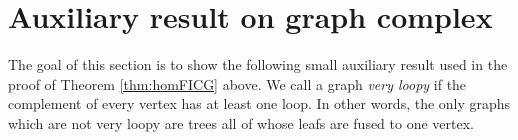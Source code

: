 \documentclass[a4paper]{amsart}
\theoremstyle{plain}
\theoremstyle{definition}
\newtheorem{rem}[thm]{Remark}
\newcommand{\alg}[1]{\mathfrak{{#1}}}
\newcommand{\SO}{\mathit{SO}}
\begin{document}
% 
% 

\section{Auxiliary result on graph complex}
The goal of this section is to show the following small auxiliary result used in the proof of Theorem \ref{thm:homFICG} above. We call a graph \emph{very loopy} if the complement of every vertex has at least one loop.
In other words, the only graphs which are not very loopy are trees all of whose leafs are fused to one vertex. 
\end{document}
